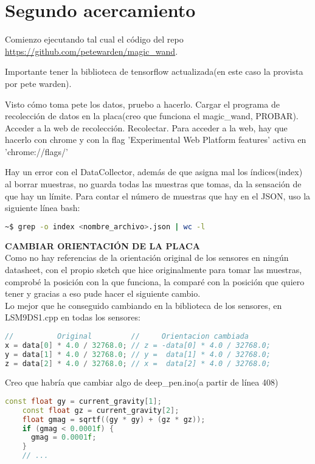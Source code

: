 
\chapter{Segundo acercamiento}
Comienzo ejecutando tal cual el código del repo
\url{https://github.com/petewarden/magic_wand}.

Importante tener la biblioteca de tensorflow actualizada(en este
caso la provista por pete warden).

Visto cómo toma pete los datos, pruebo a hacerlo.
Cargar el programa de recolección de datos en la placa(creo que funciona el magic\_wand,
PROBAR).
Acceder a la web de recolección. Recolectar.
Para acceder a la web, hay que hacerlo con chrome y con la flag
'Experimental Web Platform features' activa en 'chrome://flags/'


Hay un error con el DataCollector, además de que asigna mal los índices(index)
al borrar muestras, no guarda todas las muestras que tomas, da la sensación de que
hay un límite.
Para contar el número de muestras que hay en el JSON, uso la siguiente línea bash:
\begin{lstlisting}[language=bash]
~$ grep -o index <nombre_archivo>.json | wc -l
\end{lstlisting}



\textbf{CAMBIAR ORIENTACIÓN DE LA PLACA} \\
Como no hay referencias de la orientación original de los sensores en ningún
datasheet, con el propio sketch que hice originalmente para tomar las muestras,
comprobé la posición con la que funciona, la comparé con la posición que quiero
tener y gracias a eso pude hacer el siguiente cambio.\\
Lo mejor que he conseguido cambiando en la biblioteca de los sensores,
en LSM9DS1.cpp en todas los sensores:
\begin{lstlisting}[language=c++]
//          Original         //     Orientacion cambiada
x = data[0] * 4.0 / 32768.0; // z = -data[0] * 4.0 / 32768.0;
y = data[1] * 4.0 / 32768.0; // y =  data[1] * 4.0 / 32768.0;
z = data[2] * 4.0 / 32768.0; // x =  data[2] * 4.0 / 32768.0;
\end{lstlisting}

\newpage
Creo que habría que cambiar algo de deep\_pen.ino(a partir de línea 408)
\begin{lstlisting}[language=c++]
    const float gy = current_gravity[1];
    const float gz = current_gravity[2];
    float gmag = sqrtf((gy * gy) + (gz * gz));
    if (gmag < 0.0001f) {
      gmag = 0.0001f;
    }
    // ...
\end{lstlisting}


